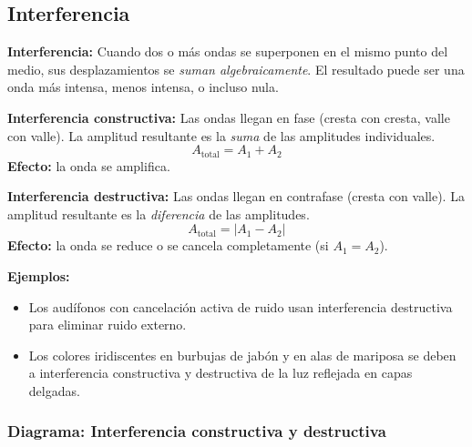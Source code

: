 \subsection{Interferencia}

\begin{seccion}
\begin{definicion}
\textbf{Interferencia:} Cuando dos o más ondas se superponen en el mismo punto del medio, sus desplazamientos se \textit{suman algebraicamente}. El resultado puede ser una onda más intensa, menos intensa, o incluso nula.
\end{definicion}

\begin{ecuacion}
\textbf{Interferencia constructiva:} Las ondas llegan en fase (cresta con cresta, valle con valle). La amplitud resultante es la \textit{suma} de las amplitudes individuales.
$$A_{\text{total}} = A_1 + A_2$$
\textbf{Efecto:} la onda se amplifica.
\end{ecuacion}

\begin{ecuacion}
\textbf{Interferencia destructiva:} Las ondas llegan en contrafase (cresta con valle). La amplitud resultante es la \textit{diferencia} de las amplitudes.
$$A_{\text{total}} = |A_1 - A_2|$$
\textbf{Efecto:} la onda se reduce o se cancela completamente (si $A_1 = A_2$).
\end{ecuacion}

\textbf{Ejemplos:}
\begin{itemize}
    \item Los audífonos con cancelación activa de ruido usan interferencia destructiva para eliminar ruido externo.
    \item Los colores iridiscentes en burbujas de jabón y en alas de mariposa se deben a interferencia constructiva y destructiva de la luz reflejada en capas delgadas.
\end{itemize}
\end{seccion}

\subsubsection{Diagrama: Interferencia constructiva y destructiva}

